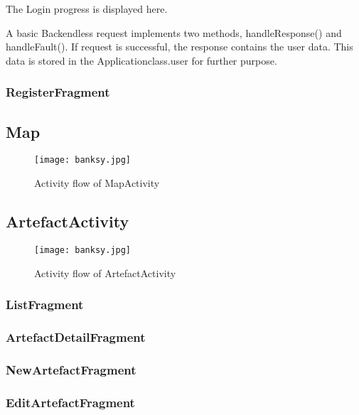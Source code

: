The Login progress is displayed here. 

\fbox{

}

A basic Backendless request implements two methods, handleResponse() and handleFault(). If request is successful, the response contains the user data. This data is stored in the Applicationclass.user for further purpose.

\subsubsection{RegisterFragment}

\subsection{Map}

\begin{figure}[H]
	\centering \texttt{[image: banksy.jpg]}
	\caption[MapActivity]{Activity flow of MapActivity\footnotemark}
	\label{fig:MapActivity}
\end{figure}

\subsection{ArtefactActivity}

\begin{figure}[H]
	\centering \texttt{[image: banksy.jpg]}
	\caption[ArtefactActivity]{Activity flow of ArtefactActivity\footnotemark}
	\label{fig:MainActivity}
\end{figure}

\subsubsection{ListFragment}
\subsubsection{ArtefactDetailFragment}
\subsubsection{NewArtefactFragment}
\subsubsection{EditArtefactFragment}

